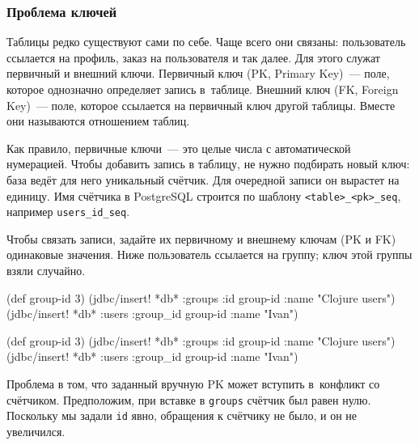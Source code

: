\subsubsection*{Проблема ключей}



Таблицы редко существуют сами по себе. Чаще всего они связаны: пользователь
ссылается на профиль, заказ на пользователя и так далее. Для этого служат
первичный и внешний ключи. Первичный ключ (PK, Primary Key)~--- поле, которое
однозначно определяет запись в~таблице. Внешний ключ (FK, Foreign Key)~--- поле,
которое ссылается на первичный ключ другой таблицы. Вместе они называются
отношением таблиц.


Как правило, первичные ключи~--- это целые числа с автоматической
нумерацией. Чтобы добавить запись в таблицу, не нужно подбирать новый ключ: база
ведёт для него уникальный счётчик. Для очередной записи он вырастет на
единицу. Имя счётчика в PostgreSQL строится по шаблону \verb|<table>_<pk>_seq|,
например \verb|users_id_seq|.

Чтобы связать записи, задайте их первичному и внешнему ключам (PK и FK)
одинаковые значения. Ниже пользователь ссылается на группу; ключ этой группы
взяли случайно.

\ifnarrow

\begin{english}
  \begin{clojure}
(def group-id 3)
(jdbc/insert! *db* :groups
  {:id group-id :name "Clojure users"})
(jdbc/insert! *db* :users
  {:group_id group-id :name "Ivan"})
  \end{clojure}
\end{english}

\else

\begin{english}
  \begin{clojure}
(def group-id 3)
(jdbc/insert! *db* :groups
   {:id group-id :name "Clojure users"})
(jdbc/insert! *db* :users
   {:group_id group-id :name "Ivan"})
  \end{clojure}
\end{english}

\fi

Проблема в том, что заданный вручную PK может вступить в~конфликт со
счётчиком. Предположим, при вставке в \verb|groups| счётчик был равен
нулю. Поскольку мы задали \verb|id| явно, обращения к счётчику не было, и он не
увеличился.

